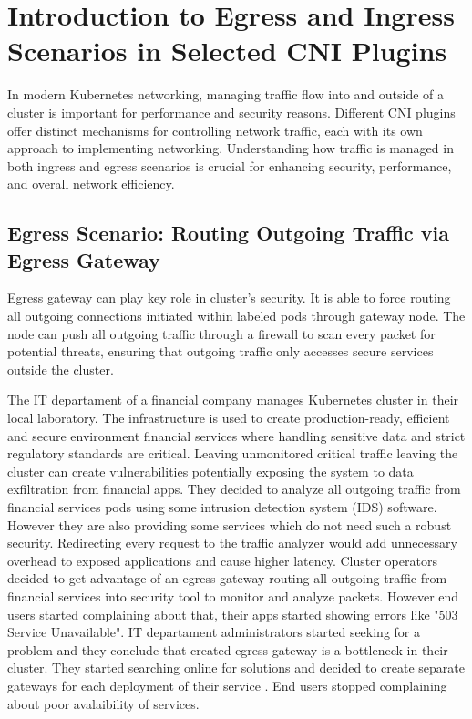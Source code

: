 \chapter{Introduction to Egress and Ingress Scenarios in Selected CNI Plugins}
\label{cha:introScenarios}
In modern Kubernetes networking, managing traffic flow into and outside of a cluster is important for performance and security reasons. Different CNI plugins offer distinct mechanisms for controlling network traffic, each with its own approach to implementing networking. Understanding how traffic is managed in both ingress and egress scenarios is crucial for enhancing security, performance, and overall network efficiency.

\section{Egress Scenario: Routing Outgoing Traffic via Egress Gateway}
\label{sec:egress}

Egress gateway can play key role in cluster's security. It is able to force routing all outgoing connections initiated within labeled pods through gateway node. The node can push all outgoing traffic through a firewall to scan every packet for potential threats, ensuring that outgoing traffic only accesses secure services outside the cluster.

The IT departament of a financial company manages Kubernetes cluster in their local laboratory. The infrastructure is used to create production-ready, efficient and secure environment financial services where handling sensitive data and strict regulatory standards are critical. Leaving unmonitored critical traffic leaving the cluster can create vulnerabilities potentially exposing the system to data exfiltration from financial apps. They decided to analyze all outgoing traffic from financial services pods using some intrusion detection system (IDS) software. However they are also providing some services which do not need such a robust security. Redirecting every request to the traffic analyzer would add unnecessary overhead to exposed applications and cause higher latency. Cluster operators decided to get advantage of an egress gateway routing all outgoing traffic from financial services into security tool to monitor and analyze packets. However end users started complaining about that, their apps started showing errors like "503 Service Unavailable". IT departament administrators started seeking for a problem and they conclude that created egress gateway is a bottleneck in their cluster. They started searching online for solutions and decided to create separate gateways for each deployment of their service \cite{CalicoEgressDeploy}. End users stopped complaining about poor avalaibility of services.

